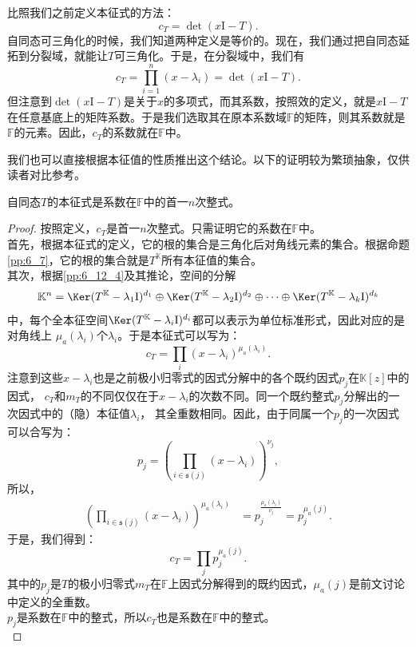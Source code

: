 \documentclass[12pt,UTF8]{ctexbook}
\begin{document}
比照我们之前定义本征式的方法：
$$
c_T = \det(x\mathrm{I} - T).
$$
自同态可三角化的时候，我们知道两种定义是等价的。现在，我们通过把自同态延拓到分裂域，就能让$T$可三角化。于是，在分裂域中，我们有
$$
c_T = \prod_{i=1}^n (x - \lambda_i) = \det(x\mathrm{I} - T).
$$
但注意到$\det(x\mathrm{I} - T)$是关于$x$的多项式，而其系数，按照效的定义，就是$x\mathrm{I} - T$在任意基底上的矩阵系数。于是我们选取其在原本系数域$\mathbb{F}$的矩阵，则其系数就是$\mathbb{F}$的元素。因此，$c_T$的系数就在$\mathbb{F}$中。

我们也可以直接根据本征值的性质推出这个结论。以下的证明较为繁琐抽象，仅供读者对比参考。
\begin{pp}\label{pp:9_8}
    自同态$T$的本征式是系数在$\mathbb{F}$中的首一$n$次整式。
\end{pp}
\begin{proof} %
    按照定义，$c_T$是首一$n$次整式。只需证明它的系数在$\mathbb{F}$中。\\
    首先，根据本征式的定义，它的根的集合是三角化后对角线元素的集合。根据命题\ref{pp:6_7}，它的根的集合就是$T^{\mathbb{K}}$所有本征值的集合。\\
    其次，根据\ref{pp:6_12_4}及其推论，空间的分解
    $$ \mathbb{K}^n = \Ker (T^{\mathbb{K}} - \lambda_1\mathrm{I})^{d_1} \oplus \Ker (T^{\mathbb{K}} - \lambda_2\mathrm{I})^{d_2} \oplus \cdots \oplus \Ker (T^{\mathbb{K}} - \lambda_k\mathrm{I})^{d_k}$$
    中，每个全本征空间$\Ker (T^{\mathbb{K}} - \lambda_i\mathrm{I})^{d_i}$都可以表示为单位标准形式，因此对应的是对角线上
    $\mu_a(\lambda_i)$个$\lambda_i$。于是本征式可以写为：
    $$c_T = \prod_{i} (x - \lambda_i)^{\mu_a(\lambda_i)}.$$
    注意到这些$x - \lambda_i$也是之前极小归零式的因式分解中的各个既约因式$p_j$在$\mathbb{K}[z]$中的因式，
    $c_T$和$m_T$的不同仅仅在于$x - \lambda_i$的次数不同。同一个既约整式$p_j$分解出的一次因式中的（隐）本征值$\lambda_i$，
    其全重数相同。因此，由于同属一个$p_j$的一次因式可以合写为：
    $$ p_j = \left(\prod_{i\in \mathfrak{s}(j)} (x - \lambda_i)\right)^{\nu_j}, $$
    所以，
    \begin{align*}
        \left(\prod_{i\in \mathfrak{s}(j)} (x - \lambda_i)\right)^{\mu_a(\lambda_i)} &= p_j^{\frac{\mu_a(\lambda_i)}{\nu_j}} = p_j^{\mu_a(j)}. 
    \end{align*}
    于是，我们得到：    
    $$c_T = \prod_{j} p_j^{\mu_a(j)}.$$
    其中的$p_j$是$T$的极小归零式$m_T$在$\mathbb{F}$上因式分解得到的既约因式，$\mu_a(j)$是前文讨论中定义的全重数。\\
    $p_j$是系数在$\mathbb{F}$中的整式，所以$c_T$也是系数在$\mathbb{F}$中的整式。\\
\end{proof}
\end{document}
